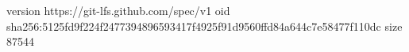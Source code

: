 version https://git-lfs.github.com/spec/v1
oid sha256:5125fd9f224f2477394896593417f4925f91d9560ffd84a644c7e58477f110dc
size 87544

